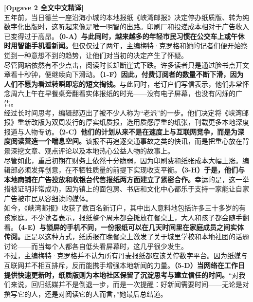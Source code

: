 \begin{transbox}
\small
\textbf{\color{NCDTeal}[Opgave 2 全文中文精译]}\\
五年前，当日德兰一座沿海小城的本地报纸《峡湾邮报》决定停办纸质版、转为纯数字化出版时，这听起来像是唯一明智的出路。印刷厂和投递成本相对于广告收入已变得过于高昂。\textbf{（0-A）与此同时，越来越多的年轻市民习惯在公交车上或午休时用智能手机看新闻。}但仅仅过了两年，主编梅特·克罗格和她的记者们便开始察觉到一种意想不到的趋势，让他们对当初的决定产生了怀疑。\\[3pt]
尽管网站依然有不少点击，阅读时长却断崖式下跌。许多读者只是通过脸书点开文章看十秒钟，便继续向下滑动。\textbf{（1-F）因此，付费订阅者的数量不断下滑，因为人们不愿为看过转瞬即忘的短文掏钱。}与此同时，老订户们写信表示，他们非常怀念周六上午在早餐桌旁翻看实体报纸的时光——没有电子屏幕，也没有闪烁的广告。\\[3pt]
经过长时间思考，编辑部迈出了被不少人称为“老派”的一步。他们决定将《峡湾邮报》重新改版为双周发行的厚实纸质报，选用质感厚重的纸张，刊载更多本地深度报道与人物专访。\textbf{（2-C）他们的计划从来不是在速度上与互联网竞争，而是为深度阅读营造一个喘息空间。}该报不再追逐交通事故之类的快讯，而是把重心放在背景深挖文章、观点评论以及本地热心公益人物的故事上。\\[3pt]
尽管如此，重启初期在财务上依然十分脆弱，因为印刷费和纸张成本大幅上涨。编辑部必须发挥创意，在不牺牲质量的前提下实现收支平衡。\textbf{（3-H）于是，他们与本地商铺在广告投放和收银台代售报纸两方面建立了紧密合作。}幸运的是，这一举措被证明非常成功，因为镇上的面包房、书店和文化中心都乐于支持一家能让自家广告被市民从容细读的媒体。\\[3pt]
如今，《峡湾邮报》收获了数百名新订户，其中出人意料地包括许多三十多岁的有孩家庭。不少读者表示，报纸整个周末都会摊放在餐桌上，大人和孩子都会随手翻看。\textbf{（4-E）与锁屏的手机不同，一份报纸可以在几天时间里在家庭成员之间实体传阅。}正是以这种方式，纸质报在晚餐桌上激发了关于城里学校和本地社团的话题讨论——而当每个人都各自低头看屏幕时，这几乎很少发生。\\[3pt]
不过，主编梅特·克罗格并不认为所有丹麦报纸都应该关停数字平台。因为纸媒与互联网并不相互排斥，反而能携手增强本地新闻的力量。\textbf{（5-D）当网络在工作日提供快速更新时，纸质版则为本地社区保留了沉淀思考与建立信任的时间。}“对我们来说，回归纸媒并不是倒退一步，而是一次提醒：好新闻需要时间——无论是对撰写它的人，还是对阅读它的人而言，”她最后总结道。
\end{transbox}

